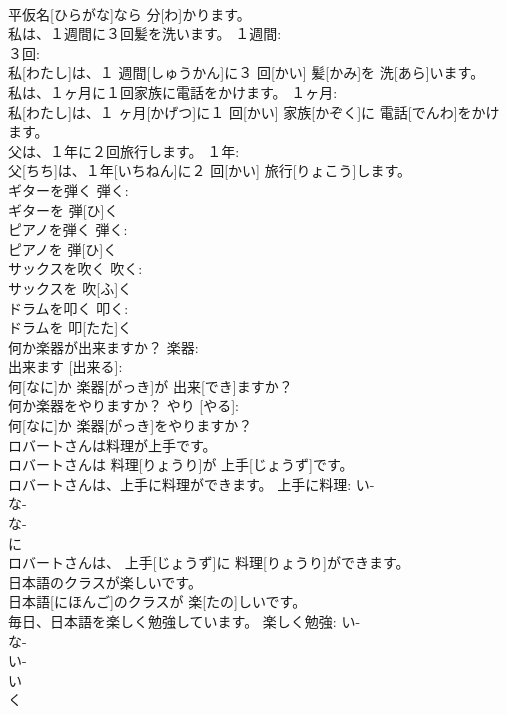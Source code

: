 \documentclass[8pt]{extreport}
\begin{document}
\begin{CJK}{UTF8}{min}
\\	平仮名[ひらがな]なら 分[わ]かります。	
\\	私は、１週間に３回髪を洗います。	１週間: 
\\	３回: 
\\	私[わたし]は、１ 週間[しゅうかん]に３ 回[かい] 髪[かみ]を 洗[あら]います。	
\\	私は、１ヶ月に１回家族に電話をかけます。	１ヶ月: 
\\	私[わたし]は、１ ヶ月[かげつ]に１ 回[かい] 家族[かぞく]に 電話[でんわ]をかけます。	
\\	父は、１年に２回旅行します。	１年: 
\\	父[ちち]は、１年[いちねん]に２ 回[かい] 旅行[りょこう]します。	
\\	ギターを弾く	弾く: 
\\	ギターを 弾[ひ]く		
\\	ピアノを弾く	弾く: 
\\	ピアノを 弾[ひ]く		
\\	サックスを吹く	吹く: 
\\	サックスを 吹[ふ]く		
\\	ドラムを叩く	叩く: 
\\	ドラムを 叩[たた]く		
\\	何か楽器が出来ますか？	楽器: 
\\	出来ます [出来る]: 
\\	何[なに]か 楽器[がっき]が 出来[でき]ますか？	
\\	何か楽器をやりますか？	やり [やる]: 
\\	何[なに]か 楽器[がっき]をやりますか？	
\\	ロバートさんは料理が上手です。	
\\	ロバートさんは 料理[りょうり]が 上手[じょうず]です。	
\\	ロバートさんは、上手に料理ができます。	上手に料理: い-
\\	な-
\\	な-
\\	に 
\\	ロバートさんは、 上手[じょうず]に 料理[りょうり]ができます。	
\\	日本語のクラスが楽しいです。	
\\	日本語[にほんご]のクラスが 楽[たの]しいです。	
\\	毎日、日本語を楽しく勉強しています。	楽しく勉強: い-
\\	な-
\\	い-
\\	い 
\\	く 

\end{CJK}
\end{document}
